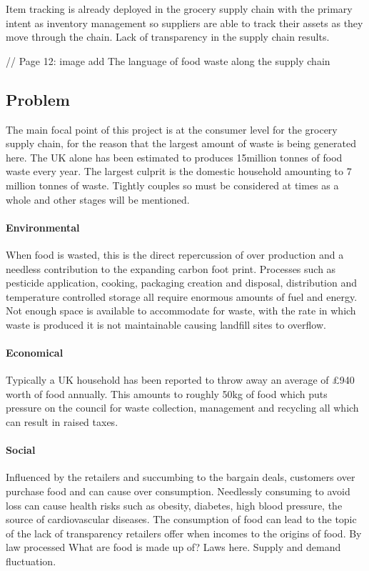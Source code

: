 \documentclass[a4paper, 11pt]{article}
\begin{document}
Item tracking is already deployed in the grocery supply chain with the primary intent as inventory management so suppliers are able to track their assets as they move through the chain. Lack of transparency in the supply chain results.
\vspace{\baselineskip}

// Page 12: image add The language of food waste along the supply chain 


\subsection{Problem}
The main focal point of this project is at the consumer level for the grocery supply chain, for the reason that the largest amount of waste is being generated here. The UK alone has been estimated to produces 15million tonnes of food waste every year. The largest culprit is the domestic household amounting to 7 million tonnes of waste. Tightly couples so must be considered at times as a whole and other stages will be mentioned.

\paragraph{Environmental} When food is wasted, this is the direct repercussion of over production and a needless contribution to the expanding carbon foot print. Processes such as pesticide application, cooking, packaging creation and disposal, distribution and temperature controlled storage all require enormous amounts of fuel and energy. Not enough space is available to accommodate for waste, with the rate in which waste is produced it is not maintainable causing landfill sites to overflow.

\paragraph{Economical} Typically a UK household has been reported to throw away an average of \pounds940 worth of food annually. This amounts to roughly 50kg of food which puts pressure on the council for waste collection, management and recycling all which can result in raised taxes. 

\paragraph{Social}Influenced by the retailers and succumbing to the bargain deals, customers over purchase food and can cause over consumption. Needlessly consuming to avoid loss can cause health risks such as obesity, diabetes, high blood pressure, the source of cardiovascular diseases. The consumption of food can lead to the topic of the lack of transparency retailers offer when incomes to the origins of food. By law processed What are food is made up of? Laws here. Supply and demand fluctuation.
\end{document}
